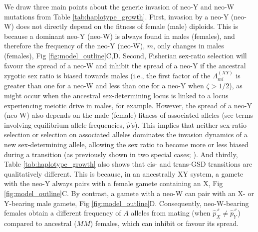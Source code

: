 \documentclass[10pt,letterpaper]{article}
\begin{document}
We draw three main points about the generic invasion of neo-Y and neo-W mutations from Table \ref{tab:haplotype_growth}.
First, invasion by a neo-Y (neo-W) does not directly depend on the fitness of female (male) diploids. %
This is because a dominant neo-Y (neo-W) is always found in males (females), and therefore the frequency of the neo-Y (neo-W), $m$, only changes in males (females), Fig \ref{fig:model_outline}C,D.
Second, Fisherian sex-ratio selection will favour the spread of a neo-W and inhibit the spread of a neo-Y if the ancestral zygotic sex ratio is biased towards males (i.e., the first factor of the $\Lambda_{mi}^{(XY)}$ is greater than one for a neo-W and less than one for a neo-Y when $\zeta>1/2$), as might occur when the ancestral sex-determining locus is linked to a locus experiencing meiotic drive in males, for example.
However, the spread of a neo-Y (neo-W) also depends on the male (female) fitness of associated alleles (see terms involving equilibrium allele frequencies, $\hat{p}$'s).
This implies that neither sex-ratio selection or selection on associated alleles dominates the invasion dynamics of a new sex-determining allele, allowing the sex ratio to become more or less biased during a transition (as previously shown in two special cases; \cite{Kozielska:2010vm,Ubeda:2015fx}). 
%
%
And thirdly, Table \ref{tab:haplotype_growth} also shows that
%
%
cis- and trans-GSD transitions are qualitatively different.
This is because, in an ancestrally XY system, a gamete with the neo-Y always pairs with a female gamete containing an X, Fig \ref{fig:model_outline}C.
By contrast, a gamete with a neo-W can pair with an X- or Y-bearing male gamete, Fig \ref{fig:model_outline}D.
Consequently, neo-W-bearing females obtain a different frequency of $A$ alleles from mating (when $\hat{p}_X^\male \neq \hat{p}_Y^\male$) compared to ancestral ($MM$) females, which can inhibit or favour its spread.
\end{document}
